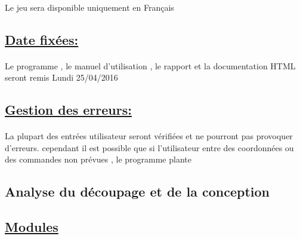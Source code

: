 \documentclass[a4paper,12pt]{article}
\begin{document}
\paragraph{}
Le jeu sera disponible uniquement en Français

\subsection{\underline{Date fixées:}}
\paragraph{}
Le programme , le manuel d'utilisation , le rapport et la documentation HTML seront remis Lundi 25/04/2016

\subsection{\underline{Gestion des erreurs:}}
\paragraph{}
La plupart des entrées utilisateur seront vérifiées et ne pourront pas provoquer d'erreurs. cependant il est possible que si l'utilisateur entre des coordonnées ou des commandes non prévues , le programme plante
\newpage
\begin{center}
\section{Analyse du découpage et de la conception}
\vspace{1cm}
\end{center}
\subsection{\underline{Modules }}
\end{document}

